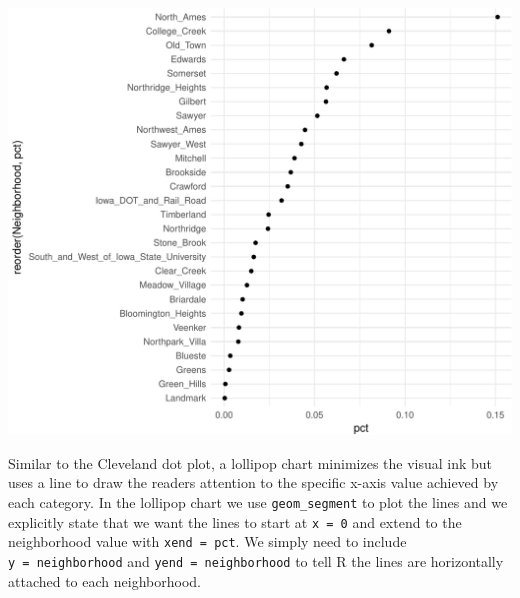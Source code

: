 \documentclass[]{article}
\newenvironment{Shaded}{\begin{snugshade}}{\end{snugshade}}
\newcommand{\KeywordTok}[1]{\textcolor[rgb]{0.13,0.29,0.53}{\textbf{#1}}}
\newcommand{\DataTypeTok}[1]{\textcolor[rgb]{0.13,0.29,0.53}{#1}}
\newcommand{\DecValTok}[1]{\textcolor[rgb]{0.00,0.00,0.81}{#1}}
\newcommand{\StringTok}[1]{\textcolor[rgb]{0.31,0.60,0.02}{#1}}
\newcommand{\OperatorTok}[1]{\textcolor[rgb]{0.81,0.36,0.00}{\textbf{#1}}}
\newcommand{\NormalTok}[1]{#1}
\begin{document}
\begin{center}\includegraphics{Chapter_3_-_Visualization_files/figure-latex/dot-1} \end{center}

Similar to the Cleveland dot plot, a lollipop chart minimizes the visual
ink but uses a line to draw the readers attention to the specific x-axis
value achieved by each category. In the lollipop chart we use
\texttt{geom\_segment} to plot the lines and we explicitly state that we
want the lines to start at \texttt{x\ =\ 0} and extend to the
neighborhood value with \texttt{xend\ =\ pct}. We simply need to include
\texttt{y\ =\ neighborhood} and \texttt{yend\ =\ neighborhood} to tell R
the lines are horizontally attached to each neighborhood.

\begin{Shaded}
\end{Shaded}
\end{document}
